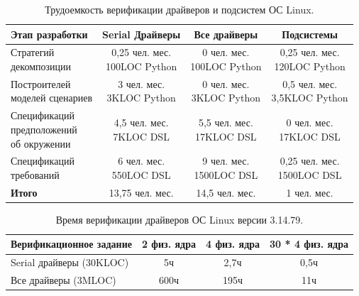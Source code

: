 \documentclass[%
autoref,
colorlinks,  
facsimile,   %
]{disser}
\begin{document}
\begin{table}
\centering
\begin{tabular}{ | l | c | c | c |}
\hline
Этап разработки& Serial Драйверы & Все драйверы & Подсистемы\\
\hline
\shortstack[l]{Стратегий \\ декомпозиции} & 
\shortstack[c]{0,25 чел. мес. \\ 100LOC Python} & 
\shortstack[c]{0 чел. мес. \\ 100LOC Python} &
\shortstack[c]{0,25 чел. мес. \\ 120LOC Python} \\
\hline
\shortstack[l]{Построителей \\ моделей сценариев} & 
\shortstack[c]{3 чел. мес. \\ 3KLOC Python} &
\shortstack[c]{0 чел. мес. \\ 3KLOC Python} &
\shortstack[c]{0,5 чел. мес. \\ 3,5KLOC Python} \\
\hline
\shortstack[l]{Спецификаций \\ предположений \\об окружении} & 
\shortstack[c]{4,5 чел. мес. \\ 7KLOC DSL} &
\shortstack[c]{5,5 чел. мес. \\ 17KLOC DSL} &
\shortstack[c]{0 чел. мес. \\ 17KLOC DSL} \\
\hline
\shortstack[l]{Спецификаций \\ требований} &
\shortstack[c]{6 чел. мес. \\ 550LOC DSL} &
\shortstack[c]{9 чел. мес. \\ 1500LOC DSL} & 
\shortstack[c]{0,25 чел. мес. \\ 1500LOC DSL} \\
\hline
\textbf{Итого} & 13,75 чел. мес. & 14,5 чел. мес. & 1 чел. мес. \\
\hline
\end{tabular}
\caption{Трудоемкость верификации драйверов и подсистем ОС Linux.}
\label{table:difficulty}
\end{table}

\begin{table}
\centering
\begin{tabular}{| l | c | c | c |}
\hline
Верификационное задание & 2 физ. ядра & 4 физ. ядра & 30 * 4 физ. ядра \\
\hline 
Serial драйверы (30KLOC) & 5ч & 2,7ч & 0,5ч \\
\hline 
Все драйверы (3MLOC) & 600ч & 195ч & 11ч \\
\hline
\end{tabular}
\caption{Время верификации драйверов ОС Linux версии 3.14.79.}
\label{table:speed}
\end{table}
\end{document}

